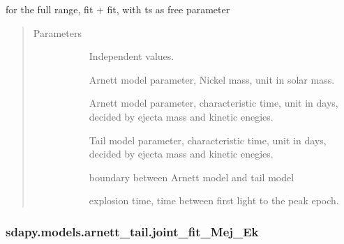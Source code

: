 \documentclass[letterpaper,10pt,english]{sphinxmanual}
\begin{document}
\begin{fulllineitems}
\label{\detokenize{generated/sdapy.models.arnett_tail.joint_fit_taum_t0:sdapy.models.arnett_tail.joint_fit_taum_t0}}
for the full range,  fit +  fit, with ts as free parameter
\begin{quote}\begin{description}
\item[{Parameters}] \leavevmode\begin{description}
\item[{}] \leavevmode{[}\sphinxtitleref{array}{]}
Independent values.

\item[{}] \leavevmode{[}\sphinxtitleref{float}{]}
Arnett model parameter, Nickel mass, unit in solar mass.

\item[{}] \leavevmode{[}\sphinxtitleref{float}{]}
Arnett model parameter, characteristic time, unit in days, decided by ejecta mass and kinetic enegies.

\item[{}] \leavevmode{[}\sphinxtitleref{float}{]}
Tail model parameter, characteristic time, unit in days, decided by ejecta mass and kinetic enegies.

\item[{}] \leavevmode{[}\sphinxtitleref{float}{]}
boundary between Arnett model and tail model

\item[{}] \leavevmode{[}\sphinxtitleref{float}{]}
explosion time, time between first light to the peak epoch.

\end{description}

\end{description}\end{quote}

\end{fulllineitems}



\subsubsection{sdapy.models.arnett\_tail.joint\_fit\_Mej\_Ek}
\label{\detokenize{generated/sdapy.models.arnett_tail.joint_fit_Mej_Ek:sdapy-models-arnett-tail-joint-fit-mej-ek}}\label{\detokenize{generated/sdapy.models.arnett_tail.joint_fit_Mej_Ek::doc}}
\end{document}
